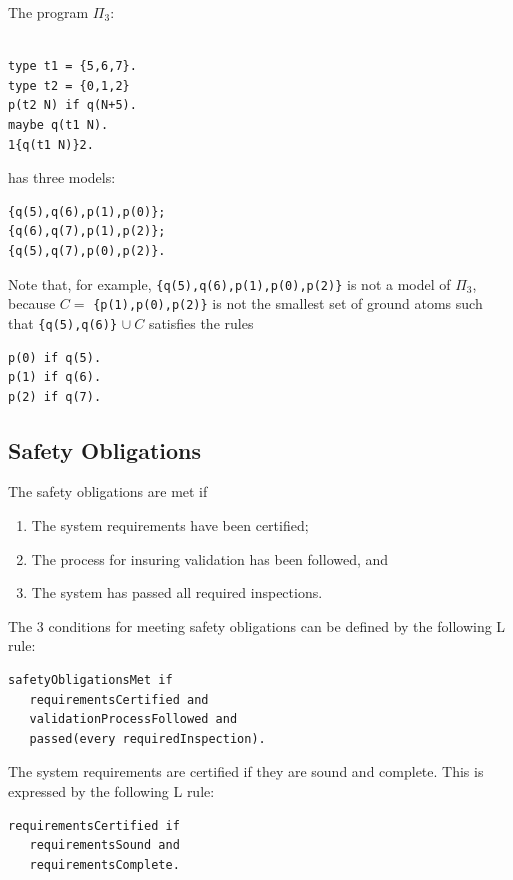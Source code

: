 \documentclass[a4paper,10pt]{article}
\begin{document}
\medskip\noindent
The program $\Pi_3$:
\begin{verbatim}

type t1 = {5,6,7}.
type t2 = {0,1,2}
p(t2 N) if q(N+5).
maybe q(t1 N).
1{q(t1 N)}2. 
\end{verbatim}
has three models:
\begin{verbatim}
{q(5),q(6),p(1),p(0)}; 
{q(6),q(7),p(1),p(2)}; 
{q(5),q(7),p(0),p(2)}.
\end{verbatim}

\medskip\noindent
Note that, for example, \texttt{\{q(5),q(6),p(1),p(0),p(2)\}} is not a model of $\Pi_3$, because $C =$ \texttt{\{p(1),p(0),p(2)\}} is not the smallest set of ground atoms such that \texttt{\{q(5),q(6)\}} $\cup~C$ satisfies the rules
\begin{verbatim}
p(0) if q(5).
p(1) if q(6).
p(2) if q(7).
\end{verbatim}
 

\subsection{Safety Obligations}

The safety obligations are met if
\begin{enumerate}
 \item The system requirements have been certified;
 \item The process for insuring validation has been followed, and
  \item The system has passed all required inspections.
\end{enumerate}

\medskip\noindent
The 3 conditions for meeting safety obligations can be defined by the following L rule:

\begin{verbatim}
safetyObligationsMet if
   requirementsCertified and
   validationProcessFollowed and
   passed(every requiredInspection).
\end{verbatim}



\medskip\noindent
The system requirements are certified if they are sound and complete. This is expressed by the following L rule:

\begin{verbatim}
requirementsCertified if
   requirementsSound and
   requirementsComplete.
\end{verbatim}
\end{document}
